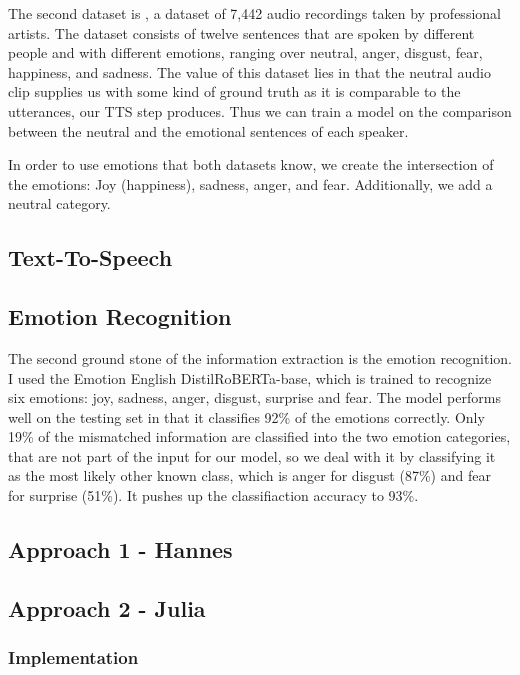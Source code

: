 \documentclass[11pt]{article}
\begin{document}
The second dataset is \cite{cao_data}, a dataset of 7,442 audio recordings taken by professional artists. The dataset consists of twelve sentences that are spoken by different people and with different emotions, ranging over neutral, anger, disgust, fear, happiness, and sadness. The value of this dataset lies in that the neutral audio clip supplies us with some kind of ground truth as it is comparable to the utterances, our TTS step produces. Thus we can train a model on the comparison between the neutral and the emotional sentences of each speaker.

In order to use emotions that both datasets know, we create the intersection of the emotions: Joy (happiness), sadness, anger, and fear. Additionally, we add a neutral category.
\subsection{Text-To-Speech}
\subsection{Emotion Recognition}

The second ground stone of the information extraction is the emotion recognition. I used the Emotion English DistilRoBERTa-base\cite{hartmann2022emotionenglish}, which is trained to recognize six emotions: joy, sadness, anger, disgust, surprise and fear. The model performs well on the testing set in that it classifies 92\% of the emotions correctly. Only 19\% of the mismatched information are classified into the two emotion categories, that are not part of the input for our model, so we deal with it by classifying it as the most likely other known class, which is anger for disgust (87\%) and fear for surprise (51\%). It pushes up the classifiaction accuracy to 93\%.

\subsection{Approach 1 - Hannes}
\subsection{Approach 2 - Julia}

\subsubsection{Implementation}
\end{document}
